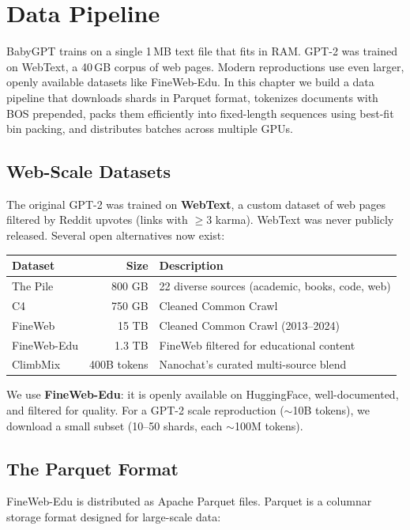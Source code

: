 \chapter{Data Pipeline}
\label{ch:data}

BabyGPT trains on a single 1\,MB text file that fits in RAM.  GPT-2 was trained on WebText, a 40\,GB corpus of web pages.  Modern reproductions use even larger, openly available datasets like FineWeb-Edu.  In this chapter we build a data pipeline that downloads shards in Parquet format, tokenizes documents with BOS prepended, packs them efficiently into fixed-length sequences using best-fit bin packing, and distributes batches across multiple GPUs.


\section{Web-Scale Datasets}

The original GPT-2 was trained on \textbf{WebText}, a custom dataset of web pages filtered by Reddit upvotes (links with $\geq 3$ karma).  WebText was never publicly released.  Several open alternatives now exist:

\begin{center}
\begin{tabular}{lrl}
\toprule
Dataset & Size & Description \\
\midrule
The Pile & 800 GB & 22 diverse sources (academic, books, code, web) \\
C4 & 750 GB & Cleaned Common Crawl \\
FineWeb & 15 TB & Cleaned Common Crawl (2013--2024) \\
FineWeb-Edu & 1.3 TB & FineWeb filtered for educational content \\
ClimbMix & 400B tokens & Nanochat's curated multi-source blend \\
\bottomrule
\end{tabular}
\end{center}

We use \textbf{FineWeb-Edu}: it is openly available on HuggingFace, well-documented, and filtered for quality.  For a GPT-2 scale reproduction ($\sim$10B tokens), we download a small subset (10--50 shards, each $\sim$100M tokens).


\section{The Parquet Format}

FineWeb-Edu is distributed as Apache Parquet files.  Parquet is a columnar storage format designed for large-scale data:

